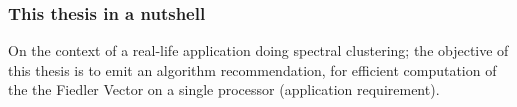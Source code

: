 \begin{frame}
  \frametitle{This thesis in a nutshell}
  \begin{block}{}
    On the context of a real-life application doing spectral
    clustering; the objective of this thesis is to emit an algorithm
    recommendation, for efficient 
    computation of the the Fiedler Vector on a single processor
    (application requirement). 
  \end{block}
\end{frame}
